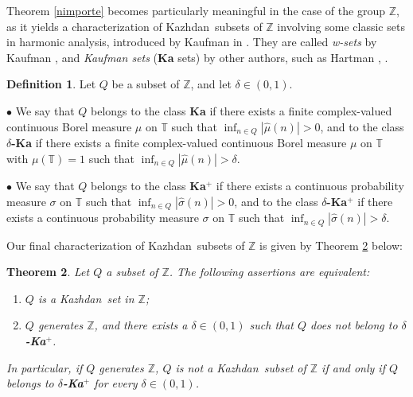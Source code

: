 \documentclass[11pt,english,a4paper]{smfart}
\numberwithin{equation}{section}
\newtheorem{theorem}{Theorem}[section]
\theoremstyle{definition}
\newtheorem{definition}[theorem]{Definition}
\begin{document}
\par\smallskip
Theorem \ref{nimporte} becomes particularly meaningful in the case of the group ${\ensuremath{\mathbb Z}}$, as it yields a characterization of {Kazhdan}\ subsets of ${\ensuremath{\mathbb Z}}$ involving some classic sets in harmonic analysis, introduced by Kaufman in \cite{Ka1}. They are called \emph{w-sets} by Kaufman \cite{Ka2}, and \emph{Kaufman sets} (\textbf{Ka} sets) by other authors, such as Hartman \cite{Ha1}, \cite{Ha2}.

\begin{definition}
Let ${Q}$ be a subset of ${\ensuremath{\mathbb Z}}$, and let $\delta\in (0,1)$.

$\bullet$ We say that ${Q}$ belongs to the class \textbf{Ka} if there exists a finite complex-valued  continuous Borel measure $\mu$ on ${\ensuremath{\mathbb T}}$ such that $\inf_{n\in{Q}}|\hat{\mu }(n)|>0$, and to the class  \textbf{$\delta$-Ka} if there exists a finite complex-valued  continuous Borel measure $\mu$ on ${\ensuremath{\mathbb T}}$ with $\mu({\ensuremath{\mathbb T}})=1$ such that $\inf_{n\in{Q}}|\hat{\mu }(n)|>\delta$.

$\bullet$ We say that ${Q}$ belongs to the class \textbf{Ka}$^{+}$ if there exists a   continuous probability measure $\sigma$ on ${\ensuremath{\mathbb T}}$ such that $\inf_{n\in{Q}}|\hat{\sigma}(n)|>0$, and to the class  \textbf{$\delta$-Ka$^{+}$} if there exists a  continuous probability measure $\sigma$ on ${\ensuremath{\mathbb T}}$  such that $\inf_{n\in{Q}}|\hat{\sigma }(n)|>\delta$.
\end{definition}

Our final characterization of {Kazhdan}\ subsets of ${\ensuremath{\mathbb Z}}$ is given by Theorem \ref{nimportebis} below:

\begin{theorem}\label{nimportebis}
 Let ${Q}$ a subset of ${\ensuremath{\mathbb Z}}$. The following assertions are equivalent:
 \begin{enumerate}
  \item [(1)] ${Q}$ is a {Kazhdan}\ set in ${\ensuremath{\mathbb Z}}$;
  \item [(2)] ${Q}$ generates ${\ensuremath{\mathbb Z}}$, and there exists a $\delta\in(0,1)$ such that ${Q}$ does not belong to \textbf{$\delta$-Ka$^{+}$}.
 \end{enumerate}
 
 In particular, if ${Q}$ generates ${\ensuremath{\mathbb Z}}$, ${Q}$ is not a {Kazhdan}\ subset of ${\ensuremath{\mathbb Z}}$ if and only if ${Q}$ belongs to  \textbf{$\delta$-Ka$^{+}$} for every $\delta\in (0,1)$.
\end{theorem}
\end{document}
